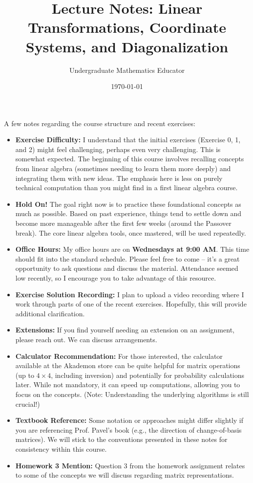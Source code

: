 \documentclass[11pt]{article}
\title{Lecture Notes: Linear Transformations, Coordinate Systems, and Diagonalization}
\author{Undergraduate Mathematics Educator}
\date{\today}
\theoremstyle{definition}
\theoremstyle{remark}
\begin{document}

\begin{adminbox}
A few notes regarding the course structure and recent exercises:

\begin{itemize}
    \item \textbf{Exercise Difficulty:} I understand that the initial exercises (Exercise 0, 1, and 2) might feel challenging, perhaps even very challenging. This is somewhat expected. The beginning of this course involves recalling concepts from linear algebra (sometimes needing to learn them more deeply) and integrating them with new ideas. The emphasis here is less on purely technical computation than you might find in a first linear algebra course.
    \item \textbf{Hold On!} The goal right now is to practice these foundational concepts as much as possible. Based on past experience, things tend to settle down and become more manageable after the first few weeks (around the Passover break). The core linear algebra tools, once mastered, will be used repeatedly.
    \item \textbf{Office Hours:} My office hours are on \textbf{Wednesdays at 9:00 AM}. This time should fit into the standard schedule. Please feel free to come – it's a great opportunity to ask questions and discuss the material. Attendance seemed low recently, so I encourage you to take advantage of this resource.
    \item \textbf{Exercise Solution Recording:} I plan to upload a video recording where I work through parts of one of the recent exercises. Hopefully, this will provide additional clarification.
    \item \textbf{Extensions:} If you find yourself needing an extension on an assignment, please reach out. We can discuss arrangements.
    \item \textbf{Calculator Recommendation:} For those interested, the calculator available at the Akademon store can be quite helpful for matrix operations (up to $4 \times 4$, including inversion) and potentially for probability calculations later. While not mandatory, it can speed up computations, allowing you to focus on the concepts. (Note: Understanding the underlying algorithms is still crucial!)
    \item \textbf{Textbook Reference:} Some notation or approaches might differ slightly if you are referencing Prof. Pavel's book (e.g., the direction of change-of-basis matrices). We will stick to the conventions presented in these notes for consistency within this course.
    \item \textbf{Homework 3 Mention:} Question 3 from the homework assignment relates to some of the concepts we will discuss regarding matrix representations.
\end{itemize}
\end{adminbox}
\end{document}
